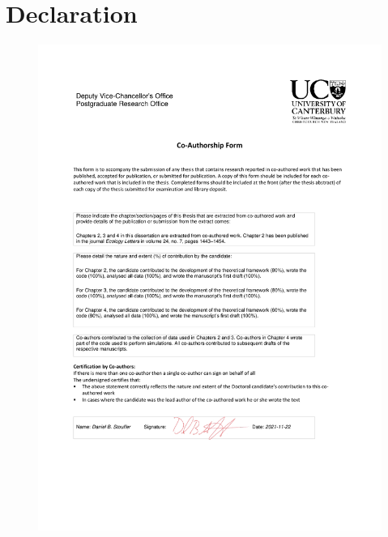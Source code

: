 
\chapter*{Declaration} %


\begin{figure}[!htbp]
    \centering
    \includegraphics[width=\textwidth]{Chapters/declaration.pdf}
\end{figure}



\thispagestyle{empty}
